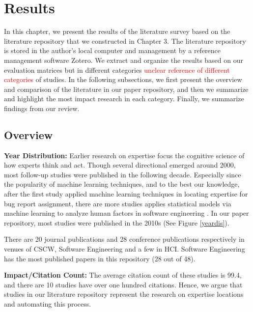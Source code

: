\chapter{Results}

In this chapter, we present the results of the literature survey based on the literature repository that we constructed in Chapter 3. The literature repository is stored in the author's local computer and management by a reference management software Zotero. We extract and organize the results based on our evaluation matrices but in different categories \textcolor{red}{unclear reference of different categories} of studies. In the following subsections, we first present the overview and comparison of the literature in our paper repository, and then we summarize and highlight the most impact research in each category. Finally, we summarize findings from our review.

\section{Overview}

\textbf{Year Distribution:} Earlier research on expertise focus the cognitive science of how experts think and act. Though several directional \cite{mcdonald1998just, mcdonald2000expertise, mockus2002expertise} emerged around 2000, most follow-up studies were published in the following decade. Especially since the popularity of machine learning techniques, and to the best our knowledge, after the first study \cite{Anvik2006who} applied machine learning techniques in locating expertise for bug report assignment,  there are more studies applies statistical models via machine learning to analyze human factors in software engineering \cite{xu2016predicting, ye2014learning}. In our paper repository, most studies were published in the 2010s (See Figure \ref{yeardis}).

There are 20 journal publications and 28 conference publications respectively in venues of CSCW, Software Engineering and a few in HCI. Software Engineering has the most published papers in this repository (28 out of 48).



\textbf{Impact/Citation Count:} The average citation count of these studies is 99.4, and there are 10 studies have over one hundred citations. Hence, we argue that studies in our literature repository represent the research on expertise locations and automating this process.

